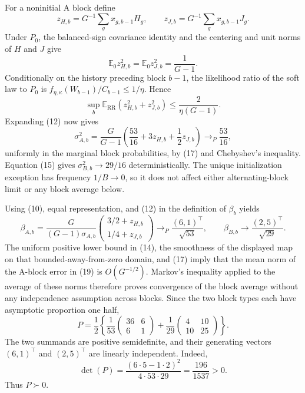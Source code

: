 For a noninitial A block define
\[
 z_{H,b}=G^{-1}\sum_gx_{g,b-1}H_g,
 \qquad
 z_{J,b}=G^{-1}\sum_gx_{g,b-1}J_g.
\]
Under \(P_0\), the balanced-sign covariance identity and the centering and unit norms of \(H\) and \(J\) give
\[
 \mathbb E_0z_{H,b}^2=\mathbb E_0z_{J,b}^2=\frac1{G-1}.     \tag{16}
\]
Conditionally on the history preceding block \(b-1\), the likelihood ratio of the soft law to \(P_0\) is
\(f_{\eta,\kappa}(W_{b-1})/C_{b-1}\leq1/\eta\).  Hence
\[
 \sup_b\mathbb E_{\mathrm{RR}}(z_{H,b}^2+z_{J,b}^2)
 \leq\frac2{\eta(G-1)}.                                   \tag{17}
\]
Expanding (12) now gives
\[
 \sigma_{A,b}^2
 =\frac G{G-1}\left(\frac{53}{16}+3z_{H,b}+\frac12z_{J,b}\right)
 \longrightarrow_P\frac{53}{16},                          \tag{18}
\]
uniformly in the marginal block probabilities, by (17) and Chebyshev's inequality.  Equation (15) gives
\(\sigma_{B,b}^2\to29/16\) deterministically.  The unique initialization exception has frequency \(1/B\to0\), so it does not affect either alternating-block limit or any block average below.

Using (10), equal representation, and (12) in the definition of \(\beta_b\) yields
\[
 \beta_{A,b}
 =\frac{G}{(G-1)\sigma_{A,b}}
   \begin{pmatrix}3/2+z_{H,b}\\[2pt]1/4+z_{J,b}\end{pmatrix}
 \longrightarrow_P\frac{(6,1)^\top}{\sqrt{53}},
 \qquad
 \beta_{B,b}\longrightarrow\frac{(2,5)^\top}{\sqrt{29}}. \tag{19}
\]
The uniform positive lower bound in (14), the smoothness of the displayed map on that bounded-away-from-zero domain, and (17) imply that the mean norm of the A-block error in (19) is \(O(G^{-1/2})\).  Markov's inequality applied to the average of these norms therefore proves convergence of the block average without any independence assumption across blocks.  Since the two block types each have asymptotic proportion one half,
\[
 P=\frac12\left\{
 \frac1{53}\begin{pmatrix}36&6\\6&1\end{pmatrix}
 +\frac1{29}\begin{pmatrix}4&10\\10&25\end{pmatrix}
 \right\}.                                                  \tag{20}
\]
The two summands are positive semidefinite, and their generating vectors \((6,1)^\top\) and \((2,5)^\top\) are linearly independent.  Indeed,
\[
 \det(P)=\frac{(6\cdot5-1\cdot2)^2}{4\cdot53\cdot29}
 =\frac{196}{1537}>0.
\]
Thus \(P\succ0\).

